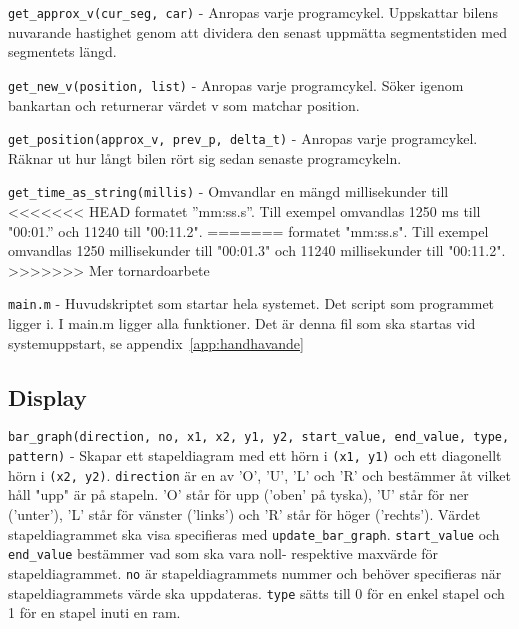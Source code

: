 \texttt{get\_approx\_v(cur\_seg, car)} - Anropas varje programcykel. Uppskattar
bilens nuvarande hastighet genom att dividera den senast uppmätta segmentstiden
med segmentets längd.


\texttt{get\_new\_v(position, list)} - Anropas varje programcykel. Söker igenom
bankartan och returnerar värdet v som matchar position.

\texttt{get\_position(approx\_v, prev\_p, delta\_t)} - Anropas varje
programcykel. Räknar ut hur långt bilen rört sig sedan senaste programcykeln.


\texttt{get\_time\_as\_string(millis)} - Omvandlar en mängd millisekunder till
<<<<<<< HEAD
formatet ''mm:ss.s''. Till exempel omvandlas 1250 ms till "00:01.'' och 11240 till
"00:11.2".
=======
formatet "mm:ss.s". Till exempel omvandlas 1250 millisekunder till "00:01.3" och
11240 millisekunder till "00:11.2".
>>>>>>> Mer tornardoarbete

\texttt{main.m} - Huvudskriptet som startar hela systemet. Det script som
programmet ligger i. I main.m ligger alla funktioner. Det är denna fil som ska
startas vid systemuppstart, se appendix~\ref{app:handhavande}


\subsection{Display}
\label{app:funktioner och filer:display}

\texttt{bar\_graph(direction, no, x1, x2, y1, y2, start\_value, end\_value,
type, pattern)} - Skapar ett stapeldiagram med ett hörn i \texttt{(x1, y1)} och
ett diagonellt hörn i \texttt{(x2, y2)}. \texttt{direction} är en av 'O', 'U',
'L' och 'R' och bestämmer åt vilket håll "upp" är på stapeln. 'O' står för upp
('oben' på tyska), 'U' står för ner ('unter'), 'L' står för vänster ('links')
och 'R' står för höger ('rechts'). Värdet stapeldiagrammet ska visa specifieras
med \texttt{update\_bar\_graph}. \texttt{start\_value} och \texttt{end\_value}
bestämmer vad som ska vara noll- respektive maxvärde för stapeldiagrammet.
\texttt{no} är stapeldiagrammets nummer och behöver specifieras när
stapeldiagrammets värde ska uppdateras. \texttt{type} sätts till 0 för en enkel
stapel och 1 för en stapel inuti en ram.


